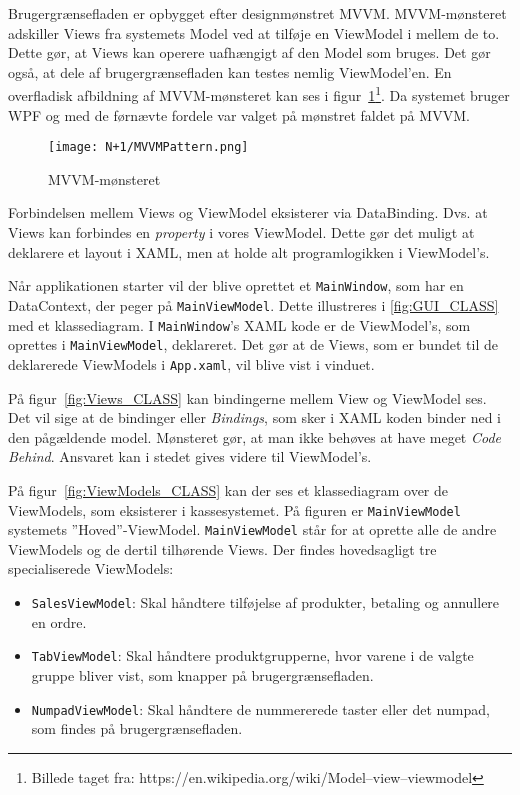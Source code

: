 Brugergrænsefladen er opbygget efter designmønstret \gls{MVVM}. \gls{MVVM}-mønsteret adskiller Views fra systemets Model ved at tilføje en ViewModel i mellem de to. Dette gør, at Views kan operere uafhængigt af den Model som bruges. Det gør også, at dele af brugergrænsefladen kan testes nemlig ViewModel'en. En overfladisk afbildning af \gls{MVVM}-mønsteret kan ses i figur~\ref{fig:MVVM}\footnote{Billede taget fra: https://en.wikipedia.org/wiki/Model–view–viewmodel}. Da systemet bruger \gls{WPF} og med de førnævte fordele var valget på mønstret faldet på \gls{MVVM}.

\begin{figure}[H]
\centering
\texttt{[image: N+1/MVVMPattern.png]}
\caption{MVVM-mønsteret}
\label{fig:MVVM}
\end{figure}

Forbindelsen mellem Views og ViewModel eksisterer via DataBinding. Dvs. at Views kan forbindes en \textit{property} i vores ViewModel. Dette gør det muligt at deklarere et layout i \gls{XAML}, men at holde alt programlogikken i ViewModel's.


Når applikationen starter vil der blive oprettet et \texttt{MainWindow}, som har en DataContext, der peger på \texttt{MainViewModel}. Dette illustreres i \ref{fig:GUI_CLASS} med et klassediagram. I \texttt{MainWindow}'s \gls{XAML} kode er de ViewModel's, som oprettes i \texttt{MainViewModel}, deklareret. Det gør at de Views, som er bundet til de deklarerede ViewModels i \texttt{App.xaml}, vil blive vist i vinduet.


På figur~\ref{fig:Views_CLASS} kan bindingerne mellem View og ViewModel ses. Det vil sige at de bindinger eller \textit{Bindings}, som sker i \gls{XAML} koden binder ned i den pågældende model. Mønsteret gør, at man ikke behøves at have meget \textit{Code Behind}. Ansvaret kan i stedet gives videre til ViewModel's.


På figur~\ref{fig:ViewModels_CLASS} kan der ses et klassediagram over de ViewModels, som eksisterer i kassesystemet. På figuren er \texttt{MainViewModel} systemets ''Hoved''-ViewModel. \texttt{MainViewModel} står for at oprette alle de andre ViewModels og de dertil tilhørende Views. Der findes hovedsagligt tre specialiserede ViewModels:
\begin{itemize}
	\item \texttt{SalesViewModel}: Skal håndtere tilføjelse af produkter, betaling og annullere en ordre.
	\item \texttt{TabViewModel}: Skal håndtere produktgrupperne, hvor varene i de valgte gruppe bliver vist, som knapper på brugergrænsefladen.
	\item \texttt{NumpadViewModel}: Skal håndtere de nummererede taster eller det numpad, som findes på brugergrænsefladen.
\end{itemize}

